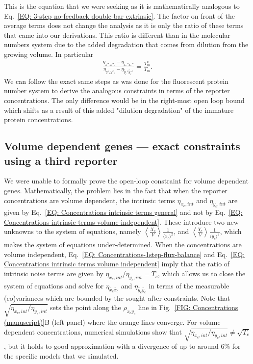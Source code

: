 \documentclass[%
 reprint,prx,
superscriptaddress,
%
%
%
%
%
%
%
%
%
 amsmath,amssymb,
 aps,
%
%
%
%
%
%
]{revtex4-2}
\begin{document}
{{This is the equation that we were seeking as it is mathematically analogous to Eq.~\eqref{EQ: 3-step no-feedback double bar extrinsic}. The factor on front of the average terms does not change the analysis as it is only the ratio of these terms that came into our derivations. This ratio is different than in the molecular numbers system due to the added degradation that comes from dilution from the growing volume. In particular
\begin{align}
 \frac{\eta_{x''_{c}x''_{c}} - \eta_{\bar{\bar{x}}_{c}''\bar{\bar{x}}_{c}''}}{\eta_{y''_{c}y''_{c}} - \eta_{\bar{\bar{y}}_{c}''\bar{\bar{y}}_{c}''}} = \frac{T_{m}^{c}}{T_{m}} .
\label{EQ: Concentrations-3step-intrinsic-relation}
\end{align}
We can follow the exact same steps as was done for the fluorescent protein number system to derive the analogous constraints in terms of the reporter concentrations. The only difference would be in the right-most open loop bound which shifts as a result of this added "dilution degradation" of the immature protein concentrations. 

\subsection{Volume dependent genes --- exact constraints using a third reporter}
\label{SEC: Appendix exact constraints on volume dependent genes}
We were unable to formally prove the open-loop constraint for volume dependent genes. Mathematically, the problem lies in the fact that when the reporter concentrations are volume dependent, the intrinsic terms $\eta_{x_{c},int}$ and $\eta_{y_{c},int}$ are given by Eq.~\eqref{EQ: Concentrations intrinsic terms general} and not by Eq.~\eqref{EQ: Concentrations intrinsic terms volume independent}. These introduce two new unknowns to the system of equations, namely $\left \langle \frac{X_{c}}{V} \right \rangle \frac{1}{\langle x_{c} \rangle^{2}}$,  and $\left \langle \frac{Y_{c}}{V} \right \rangle \frac{1}{\langle y_{c} \rangle^{2}}$, which makes the system of equations under-determined.  When the concentrations are volume independent, Eq.~\eqref{EQ: Concentrations-1step-flux-balance} and Eq.~\eqref{EQ: Concentrations intrinsic terms volume independent} imply that the ratio of intrinsic noise terms are given by  $\eta_{x_{c},int}/\eta_{y_{c},int} = T_{c}$, which allows us to close the system of equations and solve for $\eta_{\bar{x}_{c}\bar{x}_{c}}$ and $\eta_{\bar{y}_{c}\bar{y}_{c}}$ in terms of the measurable (co)variances which are bounded by the sought after constraints.  Note that $\sqrt{\eta_{x_{c},int}/\eta_{y_{c},int}}$ sets the point along the $\rho_{x_{c}y_{c}}$ line in Fig.~\ref{FIG: Concentrations (manuscript)}B (left panel) where the orange lines converge. For volume dependent concentrations, numerical simulations show that $\sqrt{\eta_{x_{c},int}/\eta_{y_{c},int}} \neq \sqrt{T_{c}}$, but it holds to good approximation with a divergence of up to around 6\% for the specific models that we simulated. 

}}
\end{document}

